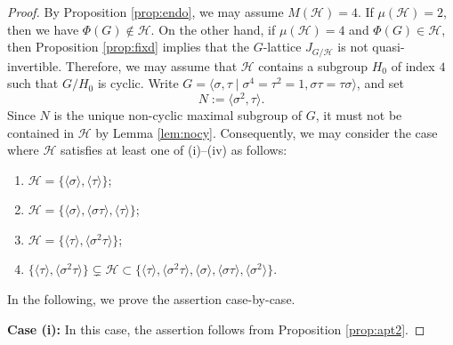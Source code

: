 \documentclass[12pt]{amsart}
\theoremstyle{plain}
\theoremstyle{definition}
\numberwithin{thm}{section}
\numberwithin{equation}{section}
\newcommand{\cH}{\mathcal{H}}
\begin{document}
\begin{proof}
By Proposition \ref{prop:endo}, we may assume $M(\cH)=4$. If $\mu(\cH)=2$, then we have $\Phi(G) \notin \cH$. On the other hand, if $\mu(\cH)=4$ and $\Phi(G)\in \cH$, then Proposition \ref{prop:fixd} implies that the $G$-lattice $J_{G/\cH}$ is not quasi-invertible. Therefore, we may assume that $\cH$ contains a subgroup $H_{0}$ of index $4$ such that $G/H_{0}$ is cyclic. Write $G=\langle \sigma,\tau\mid \sigma^{4}=\tau^{2}=1,\sigma\tau=\tau\sigma \rangle$, and set
\begin{equation*}
N:=\langle \sigma^{2},\tau \rangle. 
\end{equation*}
Since $N$ is the unique non-cyclic maximal subgroup of $G$, it must not be contained in $\cH$ by Lemma \ref{lem:nocy}. Consequently, we may consider the case where $\cH$ satisfies at least one of (i)--(iv) as follows: 
\begin{enumerate}
\item $\cH=\{\langle \sigma \rangle,\langle \tau \rangle\}$; 
\item $\cH=\{\langle \sigma \rangle,\langle \sigma \tau \rangle,\langle \tau \rangle\}$; 
\item $\cH=\{\langle \tau\rangle,\langle \sigma^{2}\tau\rangle \}$; 
\item $\{\langle \tau \rangle,\langle \sigma^{2}\tau \rangle \}\subsetneq \cH \subset \{\langle \tau \rangle,\langle \sigma^{2}\tau \rangle,\langle \sigma \rangle,\langle \sigma \tau \rangle,\langle \sigma^{2} \rangle \}$. 
\end{enumerate}
In the following, we prove the assertion case-by-case. 

\textbf{Case (i): }In this case, the assertion follows from Proposition \ref{prop:apt2}. 


\end{proof}
\end{document}
